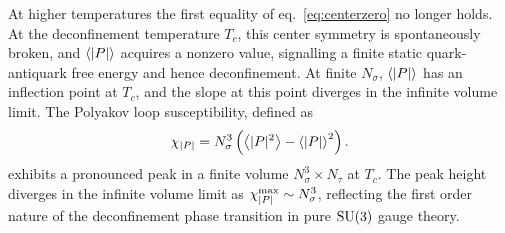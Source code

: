 At higher temperatures the first equality of eq.~\eqref{eq:centerzero}
no longer holds. At the deconfinement temperature $T_c$, this center symmetry
is spontaneously broken, and $\ev{|P|}$ acquires a nonzero value, signalling
a finite static quark-antiquark free energy and hence deconfinement.
At finite $N_\sigma$, $\ev{|P|}$ has an inflection point at $T_c$, and
the slope at this point diverges in the infinite volume limit. The Polyakov
loop susceptibility, defined as
\begin{equation}\index{Polyakov loop!susceptibility}
  \chi_{|P|}=N_\sigma^3\left(\ev{|P|^2}-\ev{|P|}^2\right).
\end{equation}
exhibits a pronounced peak in a finite volume $N_\sigma^3\times N_\tau$ at
$T_c$. The peak height diverges in the infinite volume limit as
$\chi^{\rm max}_{|P|}\sim N_\sigma^3$, reflecting the first order nature of
the deconfinement phase transition in pure $\operatorname{SU}(3)$ gauge theory.

